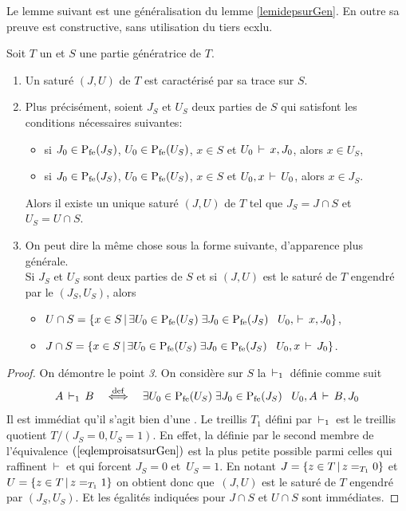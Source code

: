 Le lemme suivant est une généralisation du lemme \ref{lemidepsurGen}. En outre sa preuve est constructive, sans utilisation du tiers ecxlu.
\begin{lemma} \label{lemproisatsurGen}
Soit $T$ un \trdi et $S$ une partie génératrice de $T$. 
%
\begin{enumerate}
%
\item Un \proi saturé  $(J,U)$ de $T$ est caractérisé par sa trace sur $S$.
%
\item Plus précisément, soient $J_S$ et $U_S$ deux parties de $S$ qui satisfont les conditions nécessaires suivantes:
\begin{itemize}
%
\item si $J_0\in{{\rm P}_{{\rm fe}}}(J_S)$, $U_0\in{{\rm P}_{{\rm fe}}}(U_S)$, $x\in S$ et $U_0\,\vdash\, x,J_0$, alors $x\in U_S$,
%
\item si $J_0\in{{\rm P}_{{\rm fe}}}(J_S)$, $U_0\in{{\rm P}_{{\rm fe}}}(U_S)$, $x\in S$ et $U_0,x\,\vdash\, U_0$, alors $x\in J_S$. 
%
\end{itemize}
Alors il existe un unique \proi saturé $(J,U)$ de $T$ tel que $J_S=J\cap S$
\hbox{et $U_S=U\cap S$}.
%
\item On peut dire la même chose sous la forme suivante, d'apparence plus générale.\\
 Si $J_S$ et $U_S$ sont deux parties de $S$ et si $(J,U)$ est le \proi saturé de $T$ engendré par le \proi $(J_S,U_S)$, alors 
\begin{itemize}
%
\item $U\cap S=\{x\in S\,\vert\,\exists U_0\in{{\rm P}_{{\rm fe}}}(U_S)\;  \exists J_0\in{{\rm P}_{{\rm fe}}}(J_S)\;\;\;U_0, \,\vdash\, x,J_0\}$,
%
\item $J\cap S=\{x\in S\,\vert\,\exists U_0\in{{\rm P}_{{\rm fe}}}(U_S)\;  \exists J_0\in{{\rm P}_{{\rm fe}}}(J_S)\;\;\;U_0,x \,\vdash\, J_0\}$. 
%
\end{itemize}
%
\end{enumerate}
\end{lemma}
%
\begin{proof} On démontre le point \emph{3}.
On considère sur $S$ la \entrel $\,\vdash_{1}\,$ définie comme suit
\begin{equation} \label {eqlemproisatsurGen}
A\vdi1 B \equidef  \exists U_0\in\Pfe(U_S)\;  \exists J_0\in\Pfe(J_S)\;\;\; U_0, A\vda B,J_0
\end{equation}
Il est immédiat qu'il s'agit bien d'une \entrel. Le treillis $T_1$ défini par $\,\vdash_{1}\,$ est le treillis quotient  $T/(J_S=0,U_S=1)$.
En effet, la \entrel définie par le second membre de l'équivalence $(\ref{eqlemproisatsurGen})$ est la plus petite possible parmi celles qui raffinent $\,\vdash\,$ et qui forcent $J_S=0$ \hbox{et $U_S=1$}. 
En notant  $J=\{z\in T\,\vert\,z=_{T_1}0\}$ et $U=\{z\in T\,\vert\,z=_{T_1}1\}$ on obtient donc \hbox{que $(J,U)$} est le \proi saturé de $T$ engendré par $(J_S,U_S)$.
Et les égalités indiquées pour $J\cap S$ et $U\cap S$ sont immédiates. 
\end{proof}
%


